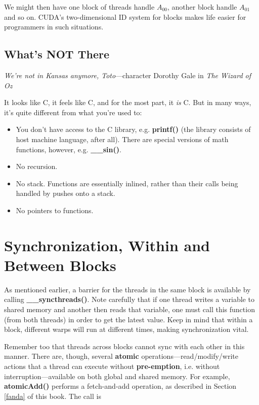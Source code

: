 We might then have one block of threads handle $A_{00}$, another block
handle $A_{01}$ and so on.  CUDA's two-dimensional ID system for blocks
makes life easier for programmers in such situations.  

\subsection{What's NOT There}

{\it We're not in Kansas anymore, Toto}---character Dorothy Gale in {\it
The Wizard of Oz}

It looks like C, it feels like C, and for the most part, it {\it is} C.
But in many ways, it's quite different from what you're used to:

\begin{itemize}

\item You don't have access to the C library, e.g. {\bf printf()} (the
library consists of host machine language, after all).  There are
special versions of math functions, however, e.g. {\bf \_\_sin()}.

\item No recursion.

\item No stack.  Functions are essentially inlined, rather than their 
calls being handled by pushes onto a stack.

\item No pointers to functions.

\end{itemize}

\section{Synchronization, Within and Between Blocks}

As mentioned earlier, a barrier for the threads in the same block is
available by calling {\bf \_\_syncthreads()}.  Note carefully that if
one thread writes a variable to shared memory and another then reads
that variable, one must call this function (from both threads) in order
to get the latest value.  Keep in mind that within a block, different
warps will run at different times, making synchronization vital.

Remember too that  threads across blocks cannot sync with each other in
this manner.  There are, though, several {\bf atomic}
operations---read/modify/write actions that a thread can execute without
{\bf pre-emption}, i.e. without interruption---available on both global
and shared memory.  For example, {\bf atomicAdd()} performs a
fetch-and-add operation, as described in Section \ref{fanda} of this
book.  The call is

